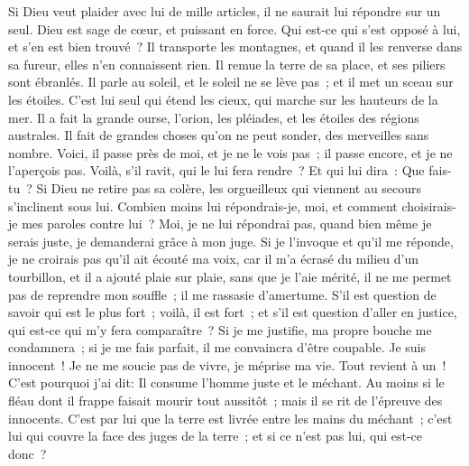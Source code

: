 \begin{multicols}{2}
Si Dieu veut plaider avec lui de mille articles, il ne saurait lui répondre sur un seul.
 Dieu est sage de cœur, et puissant en force. Qui est-ce qui s'est opposé à lui, et s'en est bien trouvé~?
Il transporte les montagnes, et quand il les renverse dans sa fureur, elles n'en connaissent rien.
Il remue la terre de sa place, et ses piliers sont ébranlés.
Il parle au soleil, et le soleil ne se lève pas~; et il met un sceau sur les étoiles.
 C'est lui seul qui étend les cieux, qui marche sur les hauteurs de la mer.
Il a fait la grande ourse, l'orion, les pléiades, et les étoiles des régions australes.
Il fait de grandes choses qu'on ne peut sonder, des merveilles sans nombre.
Voici, il passe près de moi, et je ne le vois pas~; il passe encore, et je ne l'aperçois pas.
Voilà, s'il ravit, qui le lui fera rendre~? Et qui lui dira~: Que fais-tu~?
Si Dieu ne retire pas sa colère, les orgueilleux qui viennent au secours s'inclinent sous lui.
Combien moins lui répondrais-je, moi, et comment choisirais-je mes paroles contre lui~? 
Moi, je ne lui répondrai pas, quand bien même je serais juste, je demanderai grâce à mon juge.
Si je l'invoque et qu'il me réponde, je ne croirais pas qu'il ait écouté ma voix,
car il m'a écrasé du milieu d'un tourbillon, et il a ajouté plaie sur plaie, sans que je l'aie mérité, 
il ne me permet pas de reprendre mon souffle~; il me rassasie d'amertume.
S'il est question de savoir qui est le plus fort~; voilà, il est fort~; et s'il est question d'aller en justice, qui est-ce qui m'y fera comparaître~? 
Si je me justifie, ma propre bouche me condamnera~; si je me fais parfait, il me convaincra d'être coupable.
Je suis innocent~! Je ne me soucie pas de vivre, je méprise ma vie.
Tout revient à un~! C'est pourquoi j'ai dit: Il consume l'homme juste et le méchant.
Au moins si le fléau dont il frappe faisait mourir tout aussitôt~; mais il se rit de l'épreuve des innocents. 
C'est par lui que la terre est livrée entre les mains du méchant~; c'est lui qui couvre la face des juges de la terre~; et si ce n'est pas lui, qui est-ce donc~? 

\end{multicols}
